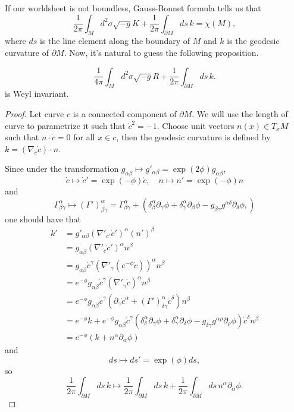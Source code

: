 If our worldsheet is not boundless, Gauss-Bonnet formula
tells us that 
\[
	\frac{1}{2\pi}\int_M d^2\sigma \sqrt{-g} K+
	\frac{1}{2\pi}\int_{\partial M}ds \,k=\chi(M),
\]
where $ds$ is the line element along the boundary of $M$
and $k$ is the geodesic curvature of $\partial M$. Now,
it's natural to guess the following proposition.

\begin{pro}
\[
\frac{1}{4\pi} \int_M d^2\sigma \sqrt{-g} R+
\frac{1}{2\pi}\int_{\partial M}ds\, k.
\]
is Weyl invariant.
\end{pro}

\begin{proof}
Let curve $c$ is a connected component of $\partial M$.
We will use the length of curve to parametrize it such
that $\dot c^2=-1$. Choose unit vectors $n(x)\in T_{x}M$ 
such that $n\cdot \dot c=0$ for all $x\in c$, then the geodesic 
curvature is defined by $k=(\nabla_{\dot c}\dot c)\cdot n$.

Since under the transformation 
$g_{\alpha\beta}\mapsto g'_{\alpha\beta}=\exp(2\phi)g_{\alpha\beta}$, 
\[
	\dot c \mapsto \dot c'=\exp(-\phi)\dot c,\quad 
	n \mapsto n'=\exp(-\phi)n
\]
and
\[
	\Gamma^\alpha_{\beta\gamma}
	\longmapsto (\Gamma')^\alpha_{\beta\gamma}=
	\Gamma^\alpha_{\beta\gamma}+
	(\delta^\alpha_\beta \partial_\gamma \phi+
	\delta^\alpha_\gamma \partial_\beta \phi-
	g_{\beta\gamma}g^{\alpha\delta}\partial_\delta \phi,
	)
\]
one should have that
\begin{align*}
	k'&=g'_{\alpha\beta}(\nabla'_{\dot c'}\dot c')^\alpha
	(n')^\beta\\
	&=g_{\alpha\beta}(\nabla'_{\dot c}\dot c')^\alpha n^\beta\\
	&=g_{\alpha\beta}\dot c^\gamma 
	(\nabla'_{\gamma}(e^{-\phi}\dot c))^\alpha n^\beta\\
	&=e^{-\phi}g_{\alpha\beta}\dot c^\gamma
	(\nabla'_{\gamma}\dot c)^\alpha n^\beta\\
	&=e^{-\phi}g_{\alpha\beta}\dot c^\gamma
(\partial_\gamma\dot c^\alpha
+(\Gamma')_{\delta\gamma}^\alpha \dot c^\delta)n^\beta\\
&=e^{-\phi}k+e^{-\phi}g_{\alpha\beta}\dot c^\gamma
(\delta^\alpha_\delta \partial_\gamma \phi+
	\delta^\alpha_\gamma \partial_\delta \phi-
	g_{\delta\gamma}g^{\alpha\rho}\partial_\rho \phi)
	\dot c^\delta n^\beta\\
&=e^{-\phi}(k+n^\alpha \partial_\alpha \phi)
\end{align*}
and
\[
	ds\longmapsto ds'=\exp(\phi)ds,
\]
so
\[
	\frac{1}{2\pi}\int_{\partial M}ds\, k\longmapsto
	\frac{1}{2\pi}\int_{\partial M}ds \, k+
	\frac{1}{2\pi}\int_{\partial M}ds \, n^\alpha 
	\partial_\alpha\phi.
\]


\end{proof}
